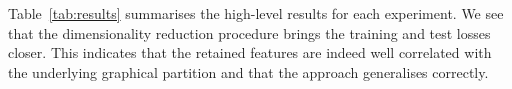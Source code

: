 Table~\ref{tab:results} summarises the high-level results for each experiment. 
We see that the dimensionality reduction procedure 
brings the training and test losses closer. This indicates that
the retained features
are indeed well correlated with the underlying graphical 
partition and that the approach generalises correctly. 
